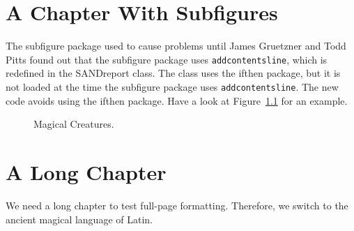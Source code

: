 \documentclass[pdf,ps2pdf,12pt,report,OUO]{SANDreport}
\begin{document}
    \chapter{A Chapter With Subfigures}
	The subfigure package used to cause problems until James
	Gruetzner and Todd Pitts found out that the subfigure
	package uses {\tt addcontentsline}, which is redefined in
	the SANDreport class. The class uses the ifthen package,
	but it is not loaded at the time the subfigure package
	uses {\tt addcontentsline}.  The new code avoids using the
	ifthen package.  Have a look at Figure~\ref{fig:creatures}
	for an example.

	\begin{figure}[ht]
	    \centering
	    \caption{Magical Creatures.}
	    \label{fig:creatures}
	\end{figure}



    \chapter{A Long Chapter}\label{sec:long}
	We need a long chapter to test full-page formatting. Therefore,
	we switch to the ancient magical language of Latin.
\end{document}
